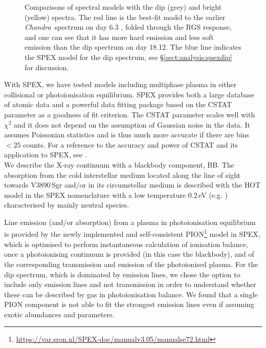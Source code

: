 \documentclass{aa}
\newcommand{\chandra}{{\it Chandra}}
\begin{document}
\begin{figure}[!ht]
\caption{\label{fig:dipspecfit}Comparisons of spectral models with the dip
(grey) and bright (yellow) spectra. The red line is the best-fit model to the
earlier \chandra\ spectrum on day 6.3 \citep{orio2020}, folded through the
RGS response, and one can see that it has more hard emission and less soft
emission than the dip spectrum on day 18.12.
The blue line indicates the SPEX model for the dip spectrum, see \S\ref{sect:analysis:spexdip} for discussion.
}
\end{figure}

With SPEX, we have tested models including multiphase plasma in either
collisional or photoionisation equilibrium.
SPEX provides both a large database of atomic data and a powerful data
fitting package based on the {\scriptsize{CSTAT}} parameter as a goodness of fit criterion.
The {\scriptsize{CSTAT}} parameter scales well with $\chi^2$ and it does not depend on the assumption
of Gaussian noise in the data. It assumes Poissonian statistics and is thus much more accurate if
there are bins $<25$ counts.
For a reference to the accuracy and power of {\scriptsize{CSTAT}} and its application to SPEX,
see \cite{kaastra2017}.\\

We describe the X-ray continuum with a blackbody component, {\scriptsize{BB}}. The
absorption from the cold interstellar medium located along the line of sight towards
V3890\,Sgr and/or in its circumstellar medium is described with the {\scriptsize{HOT}}
model in the SPEX nomenclature with a low temperature
$0.2$\,eV (e.g. \citealt{Pinto2013}) characterised by mainly neutral species.

Line emission (and/or absorption) from a plasma in photoionisation equilibrium is
provided by the newly implemented and self-consistent
{\scriptsize{PION}}\footnote{\href{https://var.sron.nl/SPEX-doc/manualv3.05/manualse72.html}{https://var.sron.nl/SPEX-doc/manualv3.05/manualse72.html}}
 model in
SPEX, which is optimised to perform instantaneous calculation of
ionisation balance, once a photoionising continuum is provided (in this case the
blackbody), and of the corresponding transmission and emission of the photoionised
plasma. For the dip spectrum, which is dominated by emission lines, we chose the
option to include only emission lines and not transmission in order to understand
whether these can be described by gas in photoionisation balance. We found that
a single
{\scriptsize{PION}} component is not able to fit the strongest emission lines
even if assuming exotic abundances and parameters.
\end{document}
